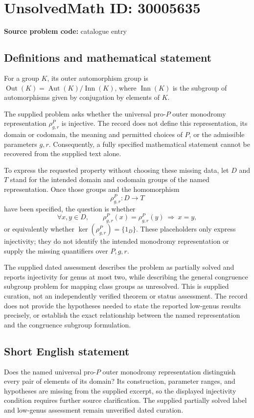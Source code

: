 \documentclass[11pt]{article}
\begin{document}
\section*{UnsolvedMath ID: 30005635}
\textbf{Source problem code:} catalogue entry
\subsection{Definitions and mathematical statement}
For a group \(K\), its outer automorphism group is \(\operatorname{Out}(K)=\operatorname{Aut}(K)/\operatorname{Inn}(K)\), where \(\operatorname{Inn}(K)\) is the subgroup of automorphisms given by conjugation by elements of \(K\).

The supplied problem asks whether the universal pro-\(P\) outer monodromy representation \(\rho^P_{g,r}\) is injective. The record does not define this representation, its domain or codomain, the meaning and permitted choices of \(P\), or the admissible parameters \(g,r\). Consequently, a fully specified mathematical statement cannot be recovered from the supplied text alone.

To express the requested property without choosing these missing data, let \(D\) and \(T\) stand for the intended domain and codomain groups of the named representation. Once those groups and the homomorphism
\[
\rho^P_{g,r}\colon D\longrightarrow T
\]
have been specified, the question is whether
\[
\forall x,y\in D,\qquad
\rho^P_{g,r}(x)=\rho^P_{g,r}(y)\ \Longrightarrow\ x=y,
\]
or equivalently whether \(\ker(\rho^P_{g,r})=\{1_D\}\). These placeholders only express injectivity; they do not identify the intended monodromy representation or supply the missing quantifiers over \(P,g,r\).

The supplied dated assessment describes the problem as partially solved and reports injectivity for genus at most two, while describing the general congruence subgroup problem for mapping class groups as unresolved. This is supplied curation, not an independently verified theorem or status assessment. The record does not provide the hypotheses needed to state the reported low-genus results precisely, or establish the exact relationship between the named representation and the congruence subgroup formulation.
\subsection{Short English statement}
Does the named universal pro-\(P\) outer monodromy representation distinguish every pair of elements of its domain? Its construction, parameter ranges, and hypotheses are missing from the supplied excerpt, so the displayed injectivity condition requires further source clarification. The supplied partially solved label and low-genus assessment remain unverified dated curation.
\end{document}
